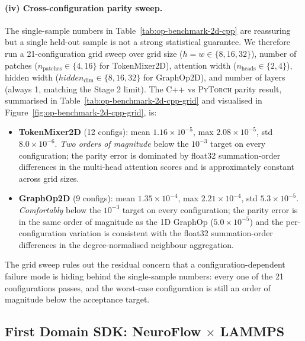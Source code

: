 \documentclass[10pt,twocolumn]{article}
\newcommand{\py}{\textsc{PyTorch}}
\begin{document}
\paragraph{(iv) Cross-configuration parity sweep.}
The single-sample numbers in
Table~\ref{tab:op-benchmark-2d-cpp} are reassuring but a
single held-out sample is not a strong statistical
guarantee.  We therefore run a 21-configuration grid sweep
over grid size ($h = w \in \{8, 16, 32\}$), number of
patches ($n_{\mathrm{patches}} \in \{4, 16\}$ for
TokenMixer2D), attention width ($n_{\mathrm{heads}} \in
\{2, 4\}$), hidden width ($hidden_{\mathrm{dim}} \in \{8,
16, 32\}$ for GraphOp2D), and number of layers (always 1,
matching the Stage 2 limit).  The C{++} vs \py{} parity
result, summarised in
Table~\ref{tab:op-benchmark-2d-cpp-grid} and visualised in
Figure~\ref{fig:op-benchmark-2d-cpp-grid}, is:
\begin{itemize}[leftmargin=*,itemsep=1pt,topsep=2pt]
  \item \textbf{TokenMixer2D} (12 configs): mean
        $1.16 \times 10^{-5}$, max $2.08 \times 10^{-5}$,
        std $8.0 \times 10^{-6}$.  \emph{Two orders of
        magnitude} below the $10^{-3}$ target on every
        configuration; the parity error is dominated by
        float32 summation-order differences in the multi-head
        attention scores and is approximately constant
        across grid sizes.
  \item \textbf{GraphOp2D} (9 configs): mean
        $1.35 \times 10^{-4}$, max $2.21 \times 10^{-4}$,
        std $5.3 \times 10^{-5}$.  \emph{Comfortably} below
        the $10^{-3}$ target on every configuration; the
        parity error is in the same order of magnitude as
        the 1D GraphOp ($5.0 \times 10^{-5}$) and the
        per-configuration variation is consistent with the
        float32 summation-order differences in the
        degree-normalised neighbour aggregation.
\end{itemize}
The grid sweep rules out the residual concern that a
configuration-dependent failure mode is hiding behind the
single-sample numbers: every one of the 21 configurations
passes, and the worst-case configuration is still an order
of magnitude below the acceptance target.

\subsection{First Domain SDK: NeuroFlow $\times$ LAMMPS}
\label{sec:lammps-sdk}
\end{document}
